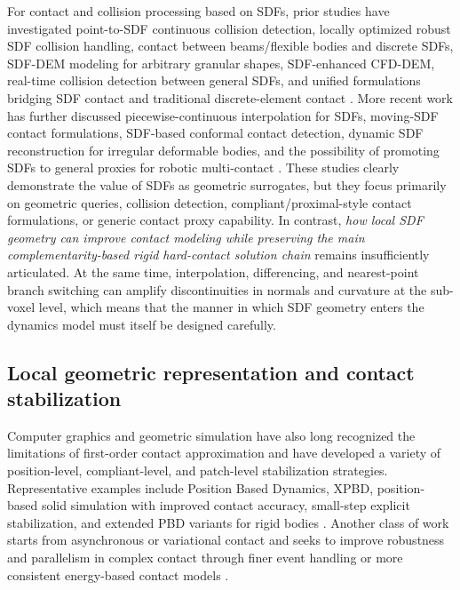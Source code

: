 For contact and collision processing based on SDFs, prior studies have investigated point-to-SDF continuous collision detection, locally optimized robust SDF collision handling, contact between beams/flexible bodies and discrete SDFs, SDF-DEM modeling for arbitrary granular shapes, SDF-enhanced CFD-DEM, real-time collision detection between general SDFs, and unified formulations bridging SDF contact and traditional discrete-element contact \cite{hapticsdf2017,macklin2020sdfcollision,sdfbeam2020,sdfdem2022,sdfcfddem2023,liu2024sdfsdf,lai2024unifying,lopez2024convexsdf}. More recent work has further discussed piecewise-continuous interpolation for SDFs, moving-SDF contact formulations, SDF-based conformal contact detection, dynamic SDF reconstruction for irregular deformable bodies, and the possibility of promoting SDFs to general proxies for robotic multi-contact \cite{adaptivesdf2023,movingframesdf2024,superellipsecontact2025,dynamicreconsdf2025,contactsdf2025}. These studies clearly demonstrate the value of SDFs as geometric surrogates, but they focus primarily on geometric queries, collision detection, compliant/proximal-style contact formulations, or generic contact proxy capability. In contrast, \emph{how local SDF geometry can improve contact modeling while preserving the main complementarity-based rigid hard-contact solution chain} remains insufficiently articulated. At the same time, interpolation, differencing, and nearest-point branch switching can amplify discontinuities in normals and curvature at the sub-voxel level, which means that the manner in which SDF geometry enters the dynamics model must itself be designed carefully.

\subsection{Local geometric representation and contact stabilization}
Computer graphics and geometric simulation have also long recognized the limitations of first-order contact approximation and have developed a variety of position-level, compliant-level, and patch-level stabilization strategies. Representative examples include Position Based Dynamics, XPBD, position-based solid simulation with improved contact accuracy, small-step explicit stabilization, and extended PBD variants for rigid bodies \cite{muller2007pbd,macklin2016xpbd,francu2017solids,macklin2019smallsteps,xpbdrigidbody2020}. Another class of work starts from asynchronous or variational contact and seeks to improve robustness and parallelism in complex contact through finer event handling or more consistent energy-based contact models \cite{harmon2009acm,vouga2011avcm,ainsley2012spacm}.

